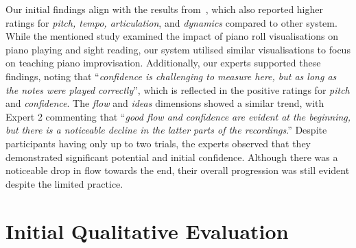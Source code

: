 \documentclass{vgtc}                          %
\begin{document}
\par %
Our initial findings align with the results from~\cite{rogers2014piano}, which also reported higher ratings for \textit{pitch, tempo, articulation}, and \textit{dynamics} compared to other system. While the mentioned study examined the impact of piano roll visualisations on piano playing and sight reading, our system utilised similar visualisations to focus on teaching piano improvisation. Additionally, our experts supported these findings, noting that ``\textit{confidence is challenging to measure here, but as long as the notes were played correctly}'', which is reflected in the positive ratings for \textit{pitch} and \textit{confidence}. The \textit{flow} and \textit{ideas} dimensions showed a similar trend, with Expert 2 commenting that ``\textit{good flow and confidence are evident at the beginning, but there is a noticeable decline in the latter parts of the recordings}.'' Despite participants having only up to two trials, the experts observed that they demonstrated significant potential and initial confidence. Although there was a noticeable drop in flow towards the end, their overall progression was still evident despite the limited practice.

\section{Initial Qualitative Evaluation}
\end{document}
